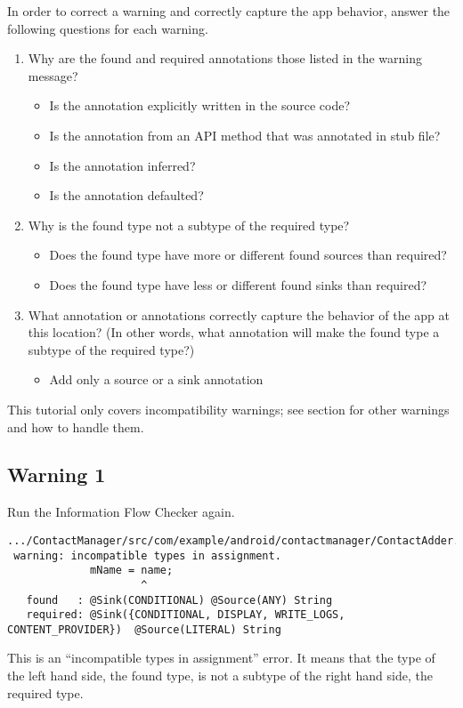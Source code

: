 In order to correct a warning and correctly capture the app behavior, answer 
the following questions for each warning.
\begin{enumerate}
\item Why are the found and required annotations those listed in the warning message?
   \begin{itemize}
    \item Is the annotation explicitly written in the source code? 
    \item Is the annotation from an API method that was annotated in stub file? 
    \item Is the annotation inferred? 
    \item Is the annotation defaulted? 
    \end{itemize}
\item Why is the found type not a subtype of the required type? 
  \begin{itemize}
   \item Does the found type have more or different found sources than required?
   \item Does the found type have less or different found sinks than required? 
   \end{itemize}
\item What annotation or annotations correctly capture the behavior of the app at
  this location? (In other words, what annotation will make the found type a 
  subtype of the required type?)
   \begin{itemize}
   \item Add only a source or a sink annotation
   \end{itemize}
\end{enumerate}

This tutorial only covers incompatibility warnings; see section  for 
other warnings and how to handle them.

\subsection{Warning 1}
Run the Information Flow Checker again.

\begin{Verbatim}  
.../ContactManager/src/com/example/android/contactmanager/ContactAdder.java:309:
 warning: incompatible types in assignment.
             mName = name;
                     ^
   found   : @Sink(CONDITIONAL) @Source(ANY) String
   required: @Sink({CONDITIONAL, DISPLAY, WRITE_LOGS, CONTENT_PROVIDER})  @Source(LITERAL) String
\end{Verbatim}
This is an ``incompatible types in assignment'' error.  It means that the type
of the left hand side, the found type, is not a subtype of the right hand side,
the required type.
 

